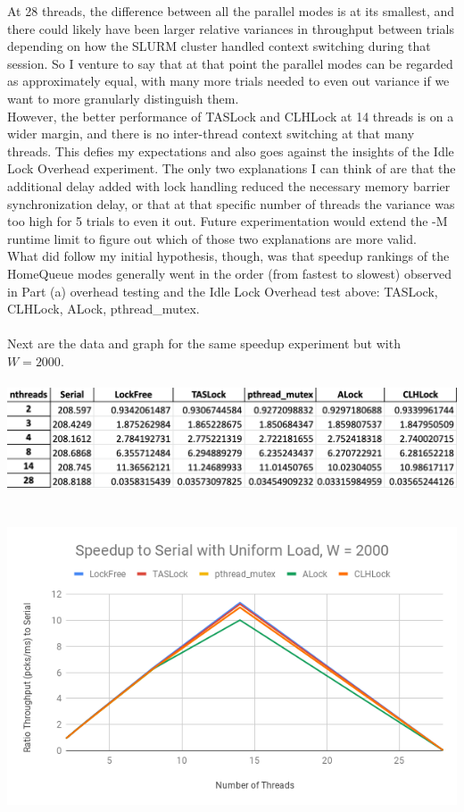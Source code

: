 \documentclass{article}
\begin{document}
\begin{adjustwidth}{-2cm}{-2cm}
At 28 threads, the difference between all the parallel modes is at its smallest, and there could likely have been larger relative variances in throughput between trials depending on how the SLURM cluster handled context switching during that session. So I venture to say that at that point the parallel modes can be regarded as approximately equal, with many more trials needed to even out variance if we want to more granularly distinguish them.\\
However, the better performance of TASLock and CLHLock at 14 threads is on a wider margin, and there is no inter-thread context switching at that many threads. This defies my expectations and also goes against the insights of the Idle Lock Overhead experiment. The only two explanations I can think of are that the additional delay added with lock handling reduced the necessary memory barrier synchronization delay, or that at that specific number of threads the variance was too high for 5 trials to even it out. Future experimentation would extend the -M runtime limit to figure out which of those two explanations are more valid.\\
What did follow my initial hypothesis, though, was that speedup rankings of the HomeQueue modes generally went in the order (from fastest to slowest) observed in Part (a) overhead testing and the Idle Lock Overhead test above: TASLock, CLHLock, ALock, pthread\_mutex.\\
\null\\Next are the data and graph for the same speedup experiment but with $W=2000$.\\
\null\\
\includegraphics[width=\linewidth]{b_uni2000Data.png}\\ \null\\
\null\\
\includegraphics[width=\linewidth]{b_uni2000Graph.png}\\ \null\\

\end{adjustwidth}
\end{document}
